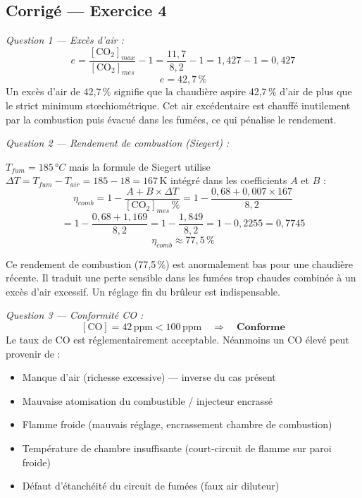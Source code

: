 
\subsection*{Corrigé — Exercice 4}

\textit{Question 1 — Excès d'air :}
\[
  e = \frac{[\text{CO}_2]_{max}}{[\text{CO}_2]_{mes}} - 1 = \frac{11{,}7}{8{,}2} - 1 = 1{,}427 - 1 = 0{,}427
\]
\[
  \boxed{e = 42{,}7\,\%}
\]
Un excès d'air de 42,7\,\% signifie que la chaudière aspire 42,7\,\% d'air de plus que le strict minimum stœchiométrique. Cet air excédentaire est chauffé inutilement par la combustion puis évacué dans les fumées, ce qui pénalise le rendement.

\textit{Question 2 — Rendement de combustion (Siegert) :}

$T_{fum} = 185\,°C$ mais la formule de Siegert utilise $\Delta T = T_{fum} - T_{air} = 185 - 18 = 167\,\text{K}$ intégré dans les coefficients $A$ et $B$ :
\[
  \eta_{comb} = 1 - \frac{A + B \times \Delta T}{[\text{CO}_2]_{mes}\,\%} = 1 - \frac{0{,}68 + 0{,}007 \times 167}{8{,}2}
\]
\[
  = 1 - \frac{0{,}68 + 1{,}169}{8{,}2} = 1 - \frac{1{,}849}{8{,}2} = 1 - 0{,}2255 = 0{,}7745
\]
\[
  \boxed{\eta_{comb} \approx 77{,}5\,\%}
\]

\begin{attention}
Ce rendement de combustion (77,5\,\%) est anormalement bas pour une chaudière récente. Il traduit une perte sensible dans les fumées trop chaudes combinée à un excès d'air excessif. Un réglage fin du brûleur est indispensable.
\end{attention}

\textit{Question 3 — Conformité CO :}
\[
  [\text{CO}] = 42\,\text{ppm} < 100\,\text{ppm} \quad \Rightarrow \quad \textbf{Conforme}
\]
Le taux de CO est réglementairement acceptable. Néanmoins un CO élevé peut provenir de :
\begin{itemize}
  \item Manque d'air (richesse excessive) — inverse du cas présent
  \item Mauvaise atomisation du combustible / injecteur encrassé
  \item Flamme froide (mauvais réglage, encrassement chambre de combustion)
  \item Température de chambre insuffisante (court-circuit de flamme sur paroi froide)
  \item Défaut d'étanchéité du circuit de fumées (faux air diluteur)
\end{itemize}


